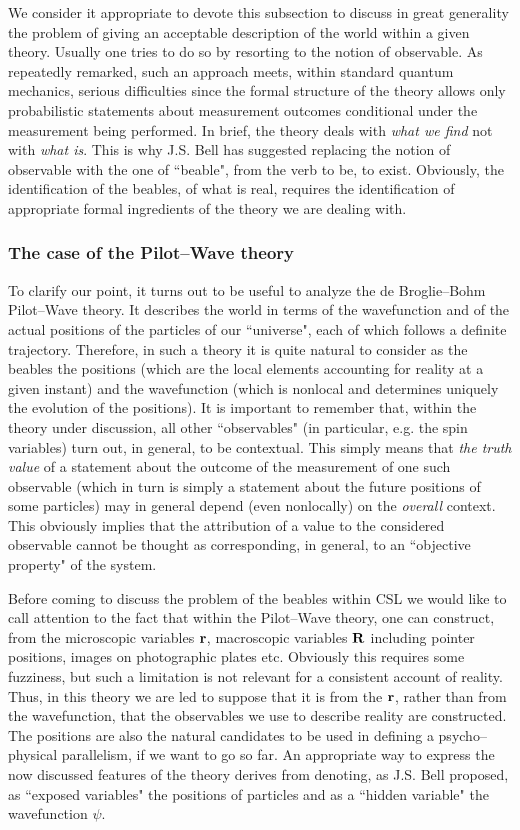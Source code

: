 \documentclass[12pt]{article}
\begin{document}
We consider it appropriate to devote this subsection to discuss in
great generality the problem of giving an acceptable description
of the world within a given theory. Usually one tries to do so by
resorting to the notion of observable. As repeatedly remarked,
such an approach meets, within standard quantum mechanics, serious
difficulties since the formal structure of the theory allows only
probabilistic statements about measurement outcomes conditional
under the measurement being performed. In brief, the theory deals
with {\it what we find} not with {\it what is}. This is why J.S.
Bell has suggested \cite{bell84}  replacing  the notion of
observable with the one of ``beable", from the verb to be, to
exist. Obviously, the identification of the beables, of what is
real, requires the identification of appropriate formal
ingredients of the theory we are dealing with.


\subsubsection{The case of the Pilot--Wave theory}
\label{sec1251}

To clarify our point, it turns out to be useful to analyze the de
Broglie--Bohm Pilot--Wave theory. It describes the world in terms
of the wavefunction and of the actual positions of the particles
of our ``universe", each of which follows a definite trajectory.
Therefore, in such a theory it is quite natural to consider as the
beables the positions (which are the local elements accounting for
reality at a given instant) and the wavefunction (which is
nonlocal and determines uniquely the evolution of the positions).
It is important to remember that, within the theory under
discussion, all other ``observables" (in particular, e.g. the spin
variables) turn out, in general, to be contextual. This simply
means that {\it the truth value} of a statement about the outcome
of the measurement of one such observable (which in turn is simply
a statement about the future positions of some particles) may in
general depend (even nonlocally) on the {\it overall} context.
This obviously implies that the attribution of a value to the
considered observable cannot be thought as corresponding, in
general, to an ``objective property" of the system.

Before coming to discuss the problem of the beables within CSL we
would like to call attention to the fact that \cite{bellqg} within
the Pilot--Wave theory, one can construct, from the microscopic
variables ${\bf r}$, macroscopic variables ${\bf R}$ including
pointer positions, images on photographic plates etc. Obviously
this requires some fuzziness, but such a limitation is not
relevant for a consistent account of reality. Thus, in this theory
we are led to suppose that it is from the ${\bf r}$, rather than
from the wavefunction, that the observables we use to describe
reality are constructed. The positions are also the natural
candidates to be used in defining a psycho--physical parallelism,
if we want to go so far. An appropriate way to express the now
discussed features of the theory derives from denoting, as J.S.
Bell proposed, as ``exposed variables" the positions of particles
and as a ``hidden variable" the wavefunction $\psi$.
\end{document}
